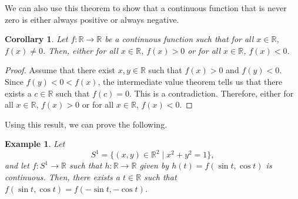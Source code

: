 \documentclass[a4paper, openany]{memoir}
\theoremstyle{definition}
\theoremstyle{plain}
\newtheorem{corollary}[definition]{Corollary}
\newtheorem{example}[definition]{Example}
\begin{document}
\noindent We can also use this theorem to show that a continuous function that is never zero is either always positive or always negative.
\begin{corollary}
Let $f: \mathbb{R} \to \mathbb{R}$ be a continuous function such that for all $x \in \mathbb{R}$, $f(x) \neq 0$. Then, either for all $x \in \mathbb{R}$, $f(x) > 0$ or for all $x \in \mathbb{R}$, $f(x) < 0$.
\end{corollary}
\begin{proof}
Assume that there exist $x, y \in \mathbb{R}$ such that $f(x) > 0$ and $f(y) < 0$. Since $f(y) < 0 < f(x)$, the intermediate value theorem tells us that there exists a $c \in \mathbb{R}$ such that $f(c) = 0$. This is a contradiction. Therefore, either for all $x \in \mathbb{R}$, $f(x) > 0$ or for all $x \in \mathbb{R}$, $f(x) < 0$.
\end{proof}
\noindent Using this result, we can prove the following.
\begin{example}
Let 
\[S^1 = \{(x, y) \in \mathbb{R}^2 \mid x^2 + y^2 = 1\},\]
and let $f: S^1 \to \mathbb{R}$ such that $h: \mathbb{R} \to \mathbb{R}$ given by $h(t) = f(\sin t, \cos t)$ is continuous. Then, there exists a $t \in \mathbb{R}$ such that $f(\sin t, \cos t) = f(-\sin t, -\cos t)$.
\end{example}
\end{document}
